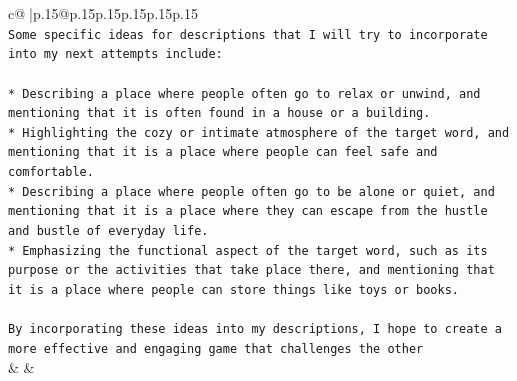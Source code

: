 \documentclass{article}
\begin{document}
{\begin{supertabular}{c@{$\;$}|p{.15\linewidth}@{}p{.15\linewidth}p{.15\linewidth}p{.15\linewidth}p{.15\linewidth}p{.15\linewidth}}
{{{\\ 
\texttt{Some specific ideas for descriptions that I will try to incorporate into my next attempts include:} \\
\\ 
\texttt{* Describing a place where people often go to relax or unwind, and mentioning that it is often found in a house or a building.} \\
\texttt{* Highlighting the cozy or intimate atmosphere of the target word, and mentioning that it is a place where people can feel safe and comfortable.} \\
\texttt{* Describing a place where people often go to be alone or quiet, and mentioning that it is a place where they can escape from the hustle and bustle of everyday life.} \\
\texttt{* Emphasizing the functional aspect of the target word, such as its purpose or the activities that take place there, and mentioning that it is a place where people can store things like toys or books.} \\
\\ 
\texttt{By incorporating these ideas into my descriptions, I hope to create a more effective and engaging game that challenges the other} \\
            }
        }
    }
    & & \\ \\


\end{supertabular}}
\end{document}

